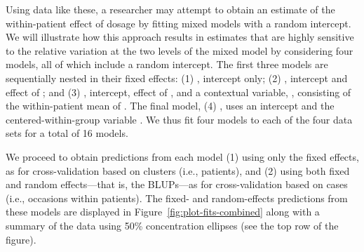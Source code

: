 \documentclass[
]{jss}
\begin{document}
Using data like these, a researcher may attempt to obtain an estimate of
the within-patient effect of dosage by fitting mixed models with a
random intercept. We will illustrate how this approach results in
estimates that are highly sensitive to the relative variation at the two
levels of the mixed model by considering four models, all of which
include a random intercept. The first three models are sequentially
nested in their fixed effects: (1) , intercept only; (2)
, intercept and effect of ; and (3)
, intercept, effect of , and a contextual
variable, , consisting of the within-patient mean of .
The final model, (4) , uses an intercept and the
centered-within-group variable . We thus fit four models to
each of the four data sets for a total of 16 models.

We proceed to obtain predictions from each model (1) using only the
fixed effects, as for cross-validation based on clusters (i.e.,
patients), and (2) using both fixed and random effects---that is, the
BLUPs---as for cross-validation based on cases (i.e., occasions within
patients). The fixed- and random-effects predictions from these models
are displayed in Figure~\ref{fig:plot-fits-combined} along with a
summary of the data using 50\% concentration ellipses (see the top row
of the figure).
\end{document}
